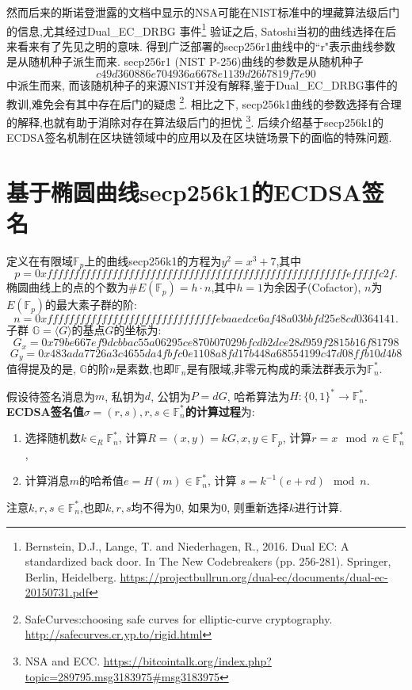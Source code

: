 \documentclass{article}
\renewcommand{\G}{\mathbb{G}}
\newcommand{\F}{\mathbb{F}}
\begin{document}
然而后来的斯诺登泄露的文档中显示的NSA可能在NIST标准中的埋藏算法级后门的信息,尤其经过Dual_EC_DRBG
事件\footnote{
Bernstein, D.J., Lange, T. and Niederhagen, R., 2016. Dual EC: A standardized back door. In The New Codebreakers (pp. 256-281). Springer, Berlin, Heidelberg.
\url{https://projectbullrun.org/dual-ec/documents/dual-ec-20150731.pdf}}
验证之后, Satoshi当初的曲线选择在后来看来有了先见之明的意味. 
得到广泛部署的secp256r1曲线中的``r"表示曲线参数是从随机种子派生而来. 
secp256r1 (NIST P-256)曲线的参数是从随机种子
$$c49d3608 86e70493 6a6678e1 139d26b7 819f7e90$$
中派生而来, 而该随机种子的来源NIST并没有解释,鉴于Dual_EC_DRBG事件的教训,难免会有其中存在后门的疑虑
\footnote{
SafeCurves:choosing safe curves for elliptic-curve cryptography. \url{http://safecurves.cr.yp.to/rigid.html}}.
相比之下, secp256k1曲线的参数选择有合理的解释,也就有助于消除对存在算法级后门的担忧
\footnote{NSA and ECC. \url{https://bitcointalk.org/index.php?topic=289795.msg3183975\#msg3183975}}.
后续介绍基于secp256k1的ECDSA签名机制在区块链领域中的应用以及在区块链场景下的面临的特殊问题.

\section{基于椭圆曲线secp256k1的ECDSA签名}

定义在有限域$\F_p$上的曲线secp256k1的方程为$y^2 = x^3 + 7$,其中
\footnotesize
$$p = 0xfffffffffffffffffffffffffffffffffffffffffffffffffffffffefffffc2f.$$
\normalsize
椭圆曲线上的点的个数为$\#E(\F_p) = h \cdot n$,其中$h = 1$为余因子(Cofactor), $n$为$E(\F_p)$的最大素子群的阶:
\footnotesize
$$ n = 0xfffffffffffffffffffffffffffffffebaaedce6af48a03bbfd25e8cd0364141.$$
\normalsize
子群 $\G = \langle G \rangle$的基点$G$的坐标为:
\footnotesize
$$G_x = 0x79be667ef9dcbbac55a06295ce870b07029bfcdb2dce28d959f2815b16f81798$$
$$G_y = 0x483ada7726a3c4655da4fbfc0e1108a8fd17b448a68554199c47d08ffb10d4b8$$
\normalsize
值得提及的是, $\G$的阶$n$是素数,也即$\F_n$是有限域,非零元构成的乘法群表示为$\F_n^*$.

假设待签名消息为$m$, 私钥为$d$, 公钥为$P=dG$, 哈希算法为$H: \{0,1\}^*\rightarrow\F_n^*$.
\textbf{ECDSA签名值$\sigma = (r,s), r, s \in \F_n^*$的计算过程}为: 
\begin{enumerate}
\item 选择随机数$k\in_R\F_n^*$, 计算$R = (x,y) = kG, x, y \in \F_p$, 计算$r = x\mod n \in \F_n^*$,
\item 计算消息$m$的哈希值$e=H(m)\in\F_n^*$, 计算 $s = k^{-1} (e + rd) \mod n$. 
\end{enumerate}
注意$k, r, s \in \F_n^*$,也即$k, r, s$均不得为0, 如果为0, 则重新选择$k$进行计算.
\end{document}
